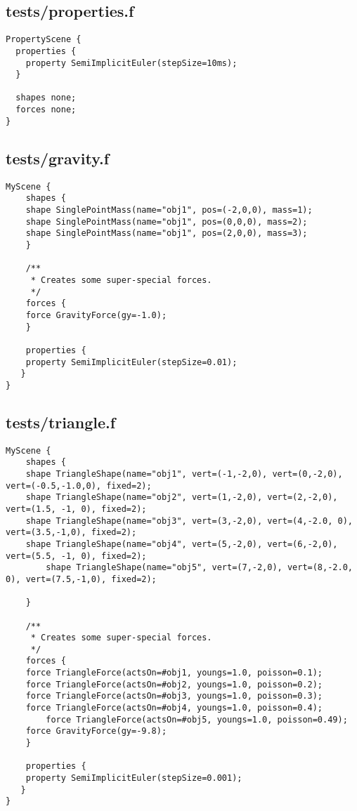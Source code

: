 \subsection*{tests/properties.f}
\begin{lstlisting}
PropertyScene {
  properties {
    property SemiImplicitEuler(stepSize=10ms);
  }

  shapes none;
  forces none;
}
\end{lstlisting}

\subsection*{tests/gravity.f}
\begin{lstlisting}
MyScene {
    shapes {
	shape SinglePointMass(name="obj1", pos=(-2,0,0), mass=1);
	shape SinglePointMass(name="obj1", pos=(0,0,0), mass=2);
	shape SinglePointMass(name="obj1", pos=(2,0,0), mass=3);
    }

    /**
     * Creates some super-special forces.
     */
    forces {
	force GravityForce(gy=-1.0);
    }

    properties { 
	property SemiImplicitEuler(stepSize=0.01);
   }
}
\end{lstlisting}

\subsection*{tests/triangle.f}
\begin{lstlisting}
MyScene {
    shapes {
	shape TriangleShape(name="obj1", vert=(-1,-2,0), vert=(0,-2,0), vert=(-0.5,-1.0,0), fixed=2);
	shape TriangleShape(name="obj2", vert=(1,-2,0), vert=(2,-2,0), vert=(1.5, -1, 0), fixed=2);
	shape TriangleShape(name="obj3", vert=(3,-2,0), vert=(4,-2.0, 0), vert=(3.5,-1,0), fixed=2);
	shape TriangleShape(name="obj4", vert=(5,-2,0), vert=(6,-2,0), vert=(5.5, -1, 0), fixed=2);
        shape TriangleShape(name="obj5", vert=(7,-2,0), vert=(8,-2.0, 0), vert=(7.5,-1,0), fixed=2);

	}

    /**
     * Creates some super-special forces.
     */
    forces {
	force TriangleForce(actsOn=#obj1, youngs=1.0, poisson=0.1);
	force TriangleForce(actsOn=#obj2, youngs=1.0, poisson=0.2);
	force TriangleForce(actsOn=#obj3, youngs=1.0, poisson=0.3);
	force TriangleForce(actsOn=#obj4, youngs=1.0, poisson=0.4);
        force TriangleForce(actsOn=#obj5, youngs=1.0, poisson=0.49);
	force GravityForce(gy=-9.8);
    }

    properties { 
	property SemiImplicitEuler(stepSize=0.001);
   }
}
\end{lstlisting}

